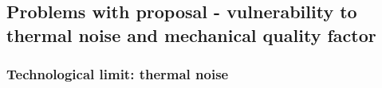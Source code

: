 



\subsection{Problems with proposal - vulnerability to thermal noise and mechanical quality factor}


\subsubsection{Technological limit: thermal noise}


